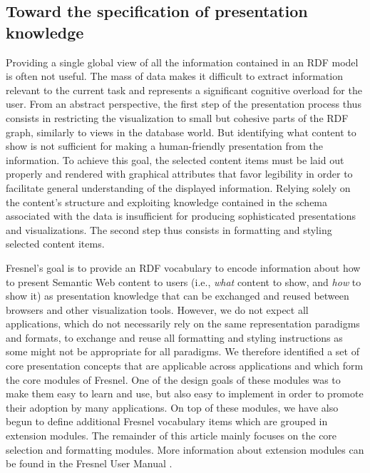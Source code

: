 \subsection{Toward the specification of presentation knowledge}

Providing a single global view of all the information contained in an
RDF model is often not useful. The mass of data makes it difficult to
extract information relevant to the current task and represents a
significant cognitive overload for the user. From an abstract
perspective, the first step of the presentation process thus consists
in restricting the visualization to small but cohesive parts of the
RDF graph, similarly to views in the database world. But identifying
what content to show is not sufficient
for making a human-friendly presentation from the information. To
achieve this goal, the selected content items must be laid out
properly and rendered with graphical attributes that favor legibility
in order to facilitate general understanding of the displayed
information. Relying solely on the content's structure and exploiting
knowledge contained in the schema associated with the data is
insufficient for producing sophisticated presentations and
visualizations. The second step thus consists in formatting and
styling selected content items.

Fresnel's goal is to provide an RDF vocabulary to encode information about how to present Semantic Web content to users (i.e., {\em what } content to show, and {\em how} to show it) as presentation knowledge that can be exchanged and reused between browsers and other visualization tools. However, we do not expect all applications, which do not necessarily rely on the same representation paradigms and formats, to exchange and reuse all formatting and styling instructions as some might not be appropriate for all paradigms. We therefore identified a set of core presentation concepts that are applicable across applications and which form the core modules of Fresnel. One of the design goals of these modules was to make them easy to learn and use, but also easy to implement in order to promote their adoption by many applications. On top of these modules, we have also begun to define additional Fresnel vocabulary items which are grouped in extension modules. The remainder of this article mainly focuses on the core selection and formatting modules. More information about extension modules can be found in the Fresnel User Manual \cite{fresnel05}.


